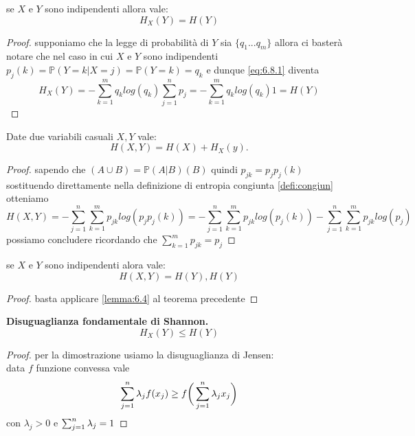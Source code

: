 \begin{lem}
se $X$ e $Y$ sono indipendenti allora vale:
\begin{equation} \label{lemma:6.4}
H_X(Y)=H(Y)
\end{equation}
\end{lem}
\begin{proof}
supponiamo che la legge di probabilità di $Y$ sia $\{q_1...q_m\}$ allora ci basterà notare che nel caso in cui $X$ e $Y$ sono indipendenti $p_j(k)=\mathbb{P}(Y=k|X=j)=\mathbb{P}(Y=k)=q_k$
e dunque \ref{eq:6.8.1} diventa
$$H_X(Y)=-\sum_{k=1}^m q_klog(q_k)\sum_{j=1}^n p_{j}=-\sum_{k=1}^m q_klog(q_k)1=H(Y)$$
\end{proof}
\begin{teo} \label{teo:6.5}
Date due variabili casuali $X,Y$ vale:
\begin{equation}
H(X,Y)=H(X)+H_X(y).
\end{equation}
\end{teo}
\begin{proof}
sapendo che \p$(A\cup B)=\mathbb{P}(A|B)$\p$(B)$ quindi $p_{jk}=p_jp_j(k)$ sostituendo direttamente nella definizione di entropia congiunta \ref{defi:congiun} otteniamo
$$H(X,Y)=-\sum_{j=1}^n\sum_{k=1}^m p_{jk}log(p_{j}p_{j}(k))=-\sum_{j=1}^n\sum_{k=1}^m p_{jk}log(p_{j}(k))-\sum_{j=1}^n\sum_{k=1}^m p_{jk}log(p_{j})$$
possiamo concludere ricordando che $\sum_{k=1}^m p_{jk}=p_j$
\end{proof}
\begin{corol}
se $X$ e $Y$ sono indipendenti alora vale:
\begin{equation}
H(X,Y)=H(Y), H(Y)
\end{equation}
\end{corol}
\begin{proof}
basta applicare \ref{lemma:6.4} al teorema precedente
\end{proof}
\begin{teo} \label{teo:disugShannon}
\textbf{Disuguaglianza fondamentale di Shannon.}\\
\begin{equation}
H_X(Y)\leq H(Y)
\end{equation}
\end{teo}
\begin{proof}
per la dimostrazione usiamo la disuguaglianza di Jensen:\\
data $f$ funzione convessa vale
\begin{equation}
\sum_{j=1}^n \lambda_j f(x_j)\geq f\bigg( \sum_{j=1}^n \lambda_j x_j \bigg)
\end{equation}
con $\lambda_j > 0$ e $\sum_{j=1}^n \lambda_j =1$
\end{proof}
